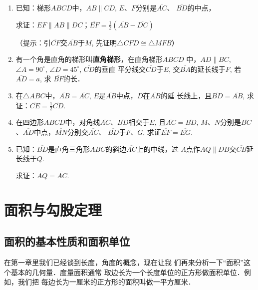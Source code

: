 \begin{enumerate}
\item 已知：梯形$ABCD$中，$AB\parallel CD$, $E$、$F$分别是$\overline{AC}$、
$\overline{BD}$的中点，

求证：$EF\parallel AB\parallel DC$；$\overline{EF}=\frac{1}{2}(\overline{AB}-\overline{DC})$

（提示：引$\overline{CF}$交$\overline{AB}$于$M$, 先证明$\triangle CFD\cong \triangle MFB$）
\item 有一个角是直角的梯形叫\textbf{直角梯形}，在直角梯形$ABCD$
中，$AD\parallel BC$, $\angle A=90^{\circ}$, $\angle D=45^{\circ}$, $\overline{CD}$的垂直
平分线交$\overline{CD}$于$E$, 交$\overline{BA}$的延长线于$F$, 若$\overline{AD}=a$, 求
$\overline{BF}$的长．
\item 在$\triangle ABC$中，$\overline{AB}=\overline{AC}$, $E$是$\overline{AB}$中点，$D$在$\overline{AB}$的延
长线上，且$\overline{BD}=\overline{AB}$, 求证：$\overline{CE}=\frac{1}{2}\overline{CD}$.
\item 在四边形$ABCD$中，对角线$\overline{AC}$、$\overline{BD}$相交于$E$, 且$\overline{AC}=\overline{BD}$, $M$、$N$分别是$\overline{BC}$、$\overline{AD}$中点，$\overline{MN}$分别交$\overline{AC}$、
$\overline{BD}$于$F$、$G$, 求证$\overline{EF}=\overline{EG}$.
\item 已知：$\overline{BD}$是直角三角形$ABC$的斜边$\overline{AC}$上的中线，过
$A$点作$AQ\parallel DB$交$\overline{CB}$延长线于$Q$.

求证：$\overline{AQ}=\overline{AC}$.

\end{enumerate}


\section{面积与勾股定理}


\subsection{面积的基本性质和面积单位}
在第一章里我们已经谈到长度，角度的概念，现在让我
们再来分析一下“面积”这个基本的几何量．度量面积通常
取边长为一个长度单位的正方形做面积单位．例如，我们把
每边长为一厘米的正方形的面积叫做一平方厘米．

\begin{figure}[htp]
    \centering
{}
    \caption{}
\end{figure}

